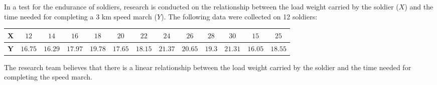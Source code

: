 \begin{enquestion}{18}{
    In a test for the endurance of soldiers, research is conducted on the relationship between the load weight carried by the soldier ($X$) and the time needed for completing a 3 km speed march ($Y$).
    The following data were collected on 12 soldiers:

    \begin{center}
        \begin{tabular}{c|cccccccccccc}
            \toprule
                $\mathbf{X}$ & $12$ & $14$ & $16$ & $18$ & $20$ & $22$ & $24$ & $26$ & $28$ & $30$ & $15$ & $25$ \\
            \midrule
                $\mathbf{Y}$ & $16.75$ & $16.29$ & $17.97$ & $19.78$ & $17.65$ & $18.15$ & $21.37$ & $20.65$ & $19.3$ & $21.31$ & $16.05$ & $18.55$ \\
            \bottomrule
        \end{tabular}
    \end{center}

    The research team believes that there is a linear relationship between the load weight carried by the soldier and the time needed for completing the speed march.
}
    


\end{enquestion}
